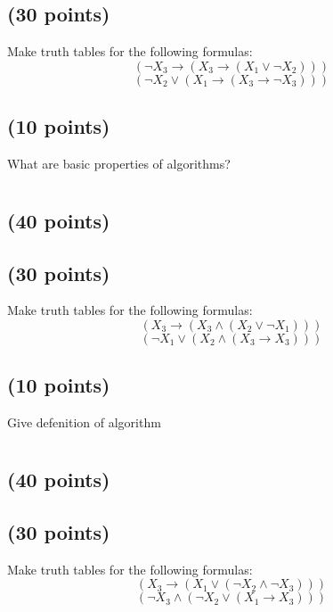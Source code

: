 \documentclass[a4paper,10pt]{article}
\begin{document}
\subsection{(30 points)}
 Make truth tables for the following formulas:
\[
(\neg X_{3} \rightarrow (X_{3} \rightarrow (X_{1} \vee \neg X_{2})))
\]
\[
(\neg X_{2} \vee (X_{1} \rightarrow (X_{3} \rightarrow \neg X_{3})))
\]

\subsection{(10 points)}
What are basic properties of algorithms?

\newpage

\section{}
\subsection{(40 points)}


\subsection{(30 points)}
 Make truth tables for the following formulas:
\[
(X_{3} \rightarrow (X_{3} \wedge (X_{2} \vee \neg X_{1})))
\]
\[
(\neg X_{1} \vee (X_{2} \wedge (X_{3} \rightarrow X_{3})))
\]

\subsection{(10 points)}
Give defenition of algorithm

\newpage

\section{}
\subsection{(40 points)}


\subsection{(30 points)}
 Make truth tables for the following formulas:
\[
(X_{3} \rightarrow (X_{1} \vee (\neg X_{2} \wedge \neg X_{3})))
\]
\[
(\neg X_{3} \wedge (\neg X_{2} \vee (X_{1} \rightarrow X_{3})))
\]
\end{document}
